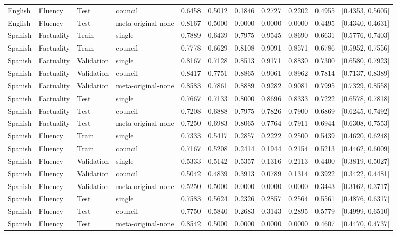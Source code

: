\begin{tabular}{llllccccccc}
English & Fluency & Test & council & 0.6458 & 0.5012 & 0.1846 & 0.2727 & 0.2202 & 0.4955 & [0.4353, 0.5605] \\
English & Fluency & Test & meta-original-none & 0.8167 & 0.5000 & 0.0000 & 0.0000 & 0.0000 & 0.4495 & [0.4340, 0.4631] \\
Spanish & Factuality & Train & single & 0.7889 & 0.6439 & 0.7975 & 0.9545 & 0.8690 & 0.6631 & [0.5776, 0.7403] \\
Spanish & Factuality & Train & council & 0.7778 & 0.6629 & 0.8108 & 0.9091 & 0.8571 & 0.6786 & [0.5952, 0.7556] \\
Spanish & Factuality & Validation & single & 0.8167 & 0.7128 & 0.8513 & 0.9171 & 0.8830 & 0.7300 & [0.6580, 0.7923] \\
Spanish & Factuality & Validation & council & 0.8417 & 0.7751 & 0.8865 & 0.9061 & 0.8962 & 0.7814 & [0.7137, 0.8389] \\
Spanish & Factuality & Validation & meta-original-none & 0.8583 & 0.7861 & 0.8889 & 0.9282 & 0.9081 & 0.7995 & [0.7329, 0.8558] \\
Spanish & Factuality & Test & single & 0.7667 & 0.7133 & 0.8000 & 0.8696 & 0.8333 & 0.7222 & [0.6578, 0.7818] \\
Spanish & Factuality & Test & council & 0.7208 & 0.6888 & 0.7975 & 0.7826 & 0.7900 & 0.6869 & [0.6245, 0.7492] \\
Spanish & Factuality & Test & meta-original-none & 0.7250 & 0.6983 & 0.8065 & 0.7764 & 0.7911 & 0.6944 & [0.6308, 0.7553] \\
Spanish & Fluency & Train & single & 0.7333 & 0.5417 & 0.2857 & 0.2222 & 0.2500 & 0.5439 & [0.4620, 0.6248] \\
Spanish & Fluency & Train & council & 0.7167 & 0.5208 & 0.2414 & 0.1944 & 0.2154 & 0.5213 & [0.4462, 0.6009] \\
Spanish & Fluency & Validation & single & 0.5333 & 0.5142 & 0.5357 & 0.1316 & 0.2113 & 0.4400 & [0.3819, 0.5027] \\
Spanish & Fluency & Validation & council & 0.5042 & 0.4839 & 0.3913 & 0.0789 & 0.1314 & 0.3922 & [0.3422, 0.4481] \\
Spanish & Fluency & Validation & meta-original-none & 0.5250 & 0.5000 & 0.0000 & 0.0000 & 0.0000 & 0.3443 & [0.3162, 0.3717] \\
Spanish & Fluency & Test & single & 0.7583 & 0.5624 & 0.2326 & 0.2857 & 0.2564 & 0.5561 & [0.4876, 0.6317] \\
Spanish & Fluency & Test & council & 0.7750 & 0.5840 & 0.2683 & 0.3143 & 0.2895 & 0.5779 & [0.4999, 0.6510] \\
Spanish & Fluency & Test & meta-original-none & 0.8542 & 0.5000 & 0.0000 & 0.0000 & 0.0000 & 0.4607 & [0.4470, 0.4737] \\
\hline
\end{tabular}
